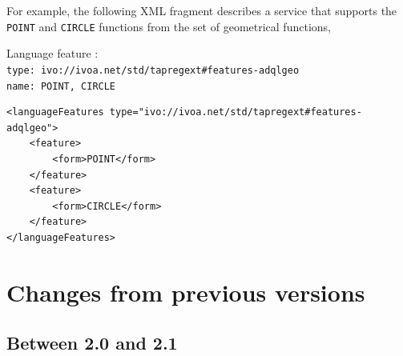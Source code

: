 \documentclass[11pt,a4paper]{ivoa}
\begin{document}
For example, the following XML fragment describes a service that supports the
\verb:POINT: and \verb:CIRCLE: functions from the set of geometrical functions,

{\footnotesize Language feature :}\\
{\footnotesize \verb|type: ivo://ivoa.net/std/tapregext#features-adqlgeo|}\\
{\footnotesize \verb|name: POINT, CIRCLE|}\\

\begin{verbatim}
<languageFeatures type="ivo://ivoa.net/std/tapregext#features-adqlgeo">
    <feature>
        <form>POINT</form>
    </feature>
    <feature>
        <form>CIRCLE</form>
    </feature>
</languageFeatures>
\end{verbatim}

\clearpage %
\section{Changes from previous versions}
\label{sec:changes}

\subsection{Between 2.0 and 2.1}
\label{sec:changes-2.1}
\end{document}
